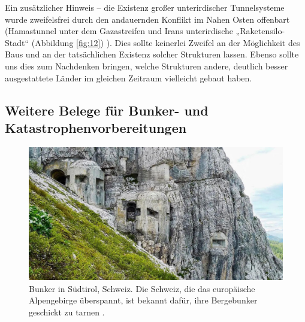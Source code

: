 \documentclass[10pt,twocolumn,letterpaper]{article}
\begin{document}
Ein zusätzlicher Hinweis – die Existenz großer unterirdischer Tunnelsysteme wurde zweifelsfrei durch den andauernden Konflikt im Nahen Osten offenbart (Hamastunnel unter dem Gazastreifen \cite{38} und Irans unterirdische „Raketensilo-Stadt“ (Abbildung \ref{fig:12}) \cite{39,40}). Dies sollte keinerlei Zweifel an der Möglichkeit des Baus und an der tatsächlichen Existenz solcher Strukturen lassen. Ebenso sollte uns dies zum Nachdenken bringen, welche Strukturen andere, deutlich besser ausgestattete Länder im gleichen Zeitraum vielleicht gebaut haben.

\subsection{Weitere Belege für Bunker- und Katastrophenvorbereitungen}

\begin{figure}[t]
\begin{center}
   \includegraphics[width=1\linewidth]{tyrol.jpg}
\end{center}
   \caption{Bunker in Südtirol, Schweiz. Die Schweiz, die das europäische Alpengebirge überspannt, ist bekannt dafür, ihre Bergebunker geschickt zu tarnen \cite{32}.}
\label{fig:7}
\label{fig:onecol}
\end{figure}
\end{document}
